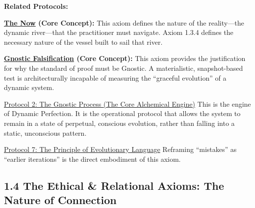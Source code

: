 \documentclass{article}
\begin{document}
\begin{nobullet}
    \item \textbf{Related Protocols:}
        \begin{nobullet}
            \item \textbf{\hyperlink{gloss:the_now}{The Now} (Core Concept):} This axiom defines the nature of the reality—the dynamic river—that the practitioner must navigate. Axiom 1.3.4 defines the necessary nature of the vessel built to sail that river.
            \item \textbf{\hyperlink{gloss:gnostic_falsification}{Gnostic Falsification} (Core Concept):} This axiom provides the justification for why the standard of proof must be Gnostic. A materialistic, snapshot-based test is architecturally incapable of measuring the ``graceful evolution'' of a dynamic system.
            \item \hyperref[protocol_2_the_gnostic_process_the_core_alchemical_engine]{Protocol 2: The Gnostic Process (The Core Alchemical Engine)} This is the engine of Dynamic Perfection. It is the operational protocol that allows the system to remain in a state of perpetual, conscious evolution, rather than falling into a static, unconscious pattern.
            \item \hyperref[protocol_7_the_principle_of_evolutionary_language]{Protocol 7: The Principle of Evolutionary Language} Reframing ``mistakes'' as ``earlier iterations'' is the direct embodiment of this axiom.
        \end{nobullet}
\end{nobullet}

\subsection*{1.4 The Ethical \& Relational Axioms: The Nature of Connection}
\end{document}
